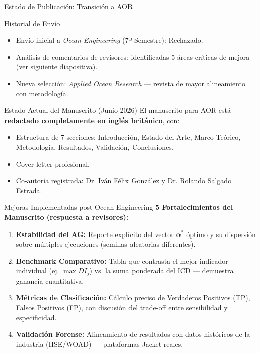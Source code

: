 \documentclass{beamer}
\begin{document}
\begin{frame}{Estado de Publicación: Transición a AOR}
    \small
    \begin{block}{Historial de Envío}
        \begin{itemize}
            \item Envío inicial a \textit{Ocean Engineering} (7º Semestre): Rechazado.
            \item Análisis de comentarios de revisores: identificadas 5 áreas críticas de mejora (ver siguiente diapositiva).
            \item Nueva selección: \textit{Applied Ocean Research} — revista de mayor alineamiento con metodología.
        \end{itemize}
    \end{block}

    \vspace{0.3cm}

    \begin{block}{Estado Actual del Manuscrito (Junio 2026)}
        El manuscrito para AOR está \textbf{redactado completamente en inglés británico}, con:
        \begin{itemize}
            \item Estructura de 7 secciones: Introducción, Estado del Arte, Marco Teórico, Metodología, Resultados, Validación, Conclusiones.
            \item Cover letter profesional.
            \item Co-autoría registrada: Dr. Iván Félix González y Dr. Rolando Salgado Estrada.
        \end{itemize}
    \end{block}
\end{frame}

\begin{frame}{Mejoras Implementadas post-Ocean Engineering}
    \small
    \textbf{5 Fortalecimientos del Manuscrito (respuesta a revisores):}

    \begin{enumerate} \footnotesize
        \setcounter{enumi}{0}
        \item \textbf{Estabilidad del AG:} Reporte explícito del vector $\boldsymbol{\alpha}^*$ óptimo y su dispersión sobre múltiples ejecuciones (semillas aleatorias diferentes).

        \item \textbf{Benchmark Comparativo:} Tabla que contrasta el mejor indicador individual (ej. $\max DI_j$) vs. la suma ponderada del ICD — demuestra ganancia cuantitativa.

        \item \textbf{Métricas de Clasificación:} Cálculo preciso de Verdaderos Positivos (TP), Falsos Positivos (FP), con discusión del trade-off entre sensibilidad y especificidad.

        \item \textbf{Validación Forense:} Alineamiento de resultados con datos históricos de la industria (HSE/WOAD) — plataformas Jacket reales.
    \end{enumerate}
\end{frame}
\end{document}
